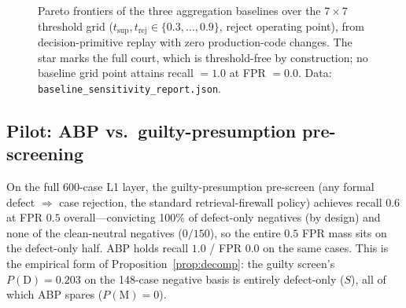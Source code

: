 \documentclass[11pt]{article}
\newcommand{\dd}{\mathrm{D}}
\newcommand{\mm}{\mathrm{M}}
\begin{document}
\begin{figure}[t]
\centering
{}
\caption{Pareto frontiers of the three aggregation baselines over the
$7\times7$ threshold grid ($t_{\mathrm{sup}}, t_{\mathrm{rej}} \in
\{0.3,\dots,0.9\}$, reject operating point), from decision-primitive
replay with zero production-code changes. The star marks the full court,
which is threshold-free by construction; no baseline grid point attains
recall $=1.0$ at FPR $=0.0$. Data:
\texttt{baseline\_sensitivity\_report.json}.}
\label{fig:pareto}
\end{figure}

\subsection{Pilot: ABP vs.\ guilty-presumption pre-screening}\label{sec:h2a}

On the full 600-case L1 layer, the guilty-presumption pre-screen (any
formal defect $\Rightarrow$ case rejection, the standard retrieval-firewall
policy) achieves recall $0.6$ at FPR $0.5$ overall—convicting 100\% of
defect-only negatives (by design) and none of the clean-neutral negatives
($0/150$), so the entire $0.5$ FPR mass sits on the defect-only half. ABP
holds recall $1.0$ / FPR $0.0$ on the same
cases. This is the empirical form of Proposition~\ref{prop:decomp}: the guilty
screen's $P(\dd)=0.203$ on the 148-case negative basis is entirely
defect-only ($S$), all of which ABP spares ($P(\mm)=0$).
\end{document}
